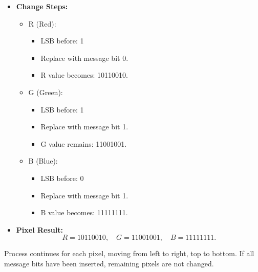 \documentclass{ittelkom}
\begin{document}
\begin{enumerate}
\begin{enumerate}
\begin{itemize}
                        \item \textbf{Change Steps:}
                              \begin{itemize}
                                  \item R (Red):
                                        \begin{itemize}
                                            \item LSB before: 1
                                            \item Replace with message bit 0.
                                            \item R value becomes: 10110010.
                                        \end{itemize}
                                  \item G (Green):
                                        \begin{itemize}
                                            \item LSB before: 1
                                            \item Replace with message bit 1.
                                            \item G value remains: 11001001.
                                        \end{itemize}
                                  \item B (Blue):
                                        \begin{itemize}
                                            \item LSB before: 0
                                            \item Replace with message bit 1.
                                            \item B value becomes: 11111111.
                                        \end{itemize}
                              \end{itemize}

                        \item \textbf{Pixel Result:}
                              \[
                                  R = 10110010, \quad G = 11001001, \quad B = 11111111.
                              \]
                    \end{itemize}

                    Process continues for each pixel, moving from left to right, top to bottom. If
                    all message bits have been inserted, remaining pixels are not changed.


\end{enumerate}
\end{enumerate}
\end{document}
